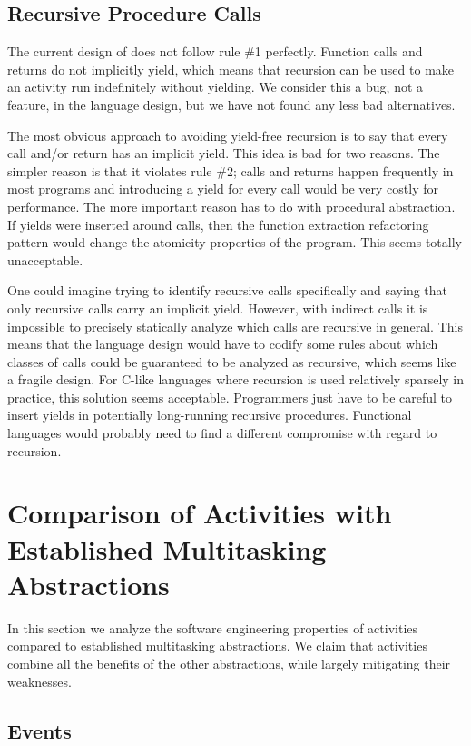 \documentclass[pldi,10pt,preprint]{sigplanconf-pldi16}
\begin{document}
\subsection{Recursive Procedure Calls}

The current design of \charcoal{} does not follow rule \#1 perfectly.
Function calls and returns do not implicitly yield, which means that recursion can be used to make an activity run indefinitely without yielding.
We consider this a bug, not a feature, in the language design, but we have not found any less bad alternatives.

The most obvious approach to avoiding yield-free recursion is to say that every call and/or return has an implicit yield.
This idea is bad for two reasons.
The simpler reason is that it violates rule \#2; calls and returns happen frequently in most programs and introducing a yield for every call would be very costly for performance.
The more important reason has to do with procedural abstraction.
If yields were inserted around calls, then the function extraction refactoring pattern would change the atomicity properties of the program.
This seems totally unacceptable.

One could imagine trying to identify recursive calls specifically and saying that only recursive calls carry an implicit yield.
However, with indirect calls it is impossible to precisely statically analyze which calls are recursive in general.
This means that the language design would have to codify some rules about which classes of calls could be guaranteed to be analyzed as recursive, which seems like a fragile design.
For C-like languages where recursion is used relatively sparsely in practice, this solution seems acceptable.
Programmers just have to be careful to insert yields in potentially long-running recursive procedures.
Functional languages would probably need to find a different compromise with regard to recursion.

\section{Comparison of Activities with Established Multitasking Abstractions}

In this section we analyze the software engineering properties of activities compared to established multitasking abstractions.
We claim that activities combine all the benefits of the other abstractions, while largely mitigating their weaknesses.

\subsection{Events}
\end{document}
